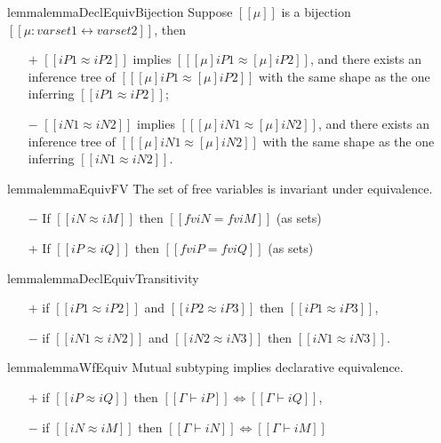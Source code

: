 \begin{restatable}{lemma}{lemmaDeclEquivBijection}
    \label{lemma:decl-equiv-bijection}
    Suppose $[[μ]]$ is a bijection $[[μ : varset1 ↔ varset2]]$, then
    \begin{itemize}
        \item[$+$] $[[iP1 ≈ iP2]]$ implies $[[ [μ]iP1 ≈ [μ]iP2 ]]$,
            and there exists an inference tree of $[[ [μ]iP1 ≈ [μ]iP2 ]]$
            with the same shape as the one inferring $[[iP1 ≈ iP2]]$;
        \item[$-$] $[[iN1 ≈ iN2]]$ implies $[[ [μ]iN1 ≈ [μ]iN2 ]]$, 
            and there exists an inference tree of $[[ [μ]iN1 ≈ [μ]iN2 ]]$
            with the same shape as the one inferring $[[iN1 ≈ iN2]]$.
    \end{itemize}
\end{restatable}

\begin{restatable}{lemma}{lemmaEquivFV}
    \label{lemma:equiv-fv}
    The set of free variables is invariant under equivalence.
    \begin{itemize}
    \item[$-$] If $[[iN ≈ iM]]$ then $[[fv iN = fv iM]]$ (as sets)
    \item[$+$] If $[[iP ≈ iQ]]$ then $[[fv iP = fv iQ]]$ (as sets)
    \end{itemize}
\end{restatable}


\begin{restatable}{lemma}{lemmaDeclEquivTransitivity}
    \hfill
    \label{lemma:decl-equiv-transitivity}
    \begin{itemize}
        \item[$+$] if $[[iP1 ≈ iP2]]$ and $[[iP2 ≈ iP3]]$ then $[[iP1 ≈ iP3]]$,
        \item[$-$] if $[[iN1 ≈ iN2]]$ and $[[iN2 ≈ iN3]]$ then $[[iN1 ≈ iN3]]$.
    \end{itemize}
\end{restatable}


\begin{restatable}{lemma}{lemmaWfEquiv}
    \label{lemma:wf-equiv}
    Mutual subtyping implies declarative equivalence.
    \begin{itemize}
    \item[$+$] if $[[iP ≈ iQ]]$ then $[[Γ ⊢ iP]] \iff [[Γ ⊢ iQ]]$,
    \item[$-$] if $[[iN ≈ iM]]$ then $[[Γ ⊢ iN]] \iff [[Γ ⊢ iM]]$
    \end{itemize}
\end{restatable}


